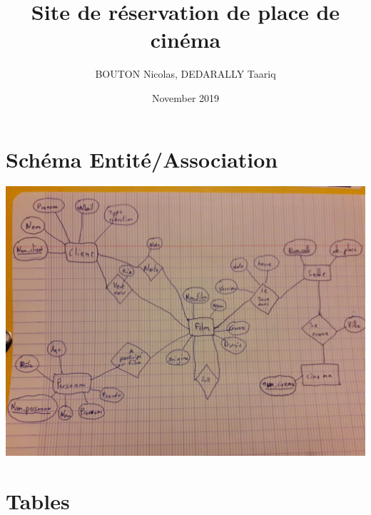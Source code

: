 \documentclass{article}
\title{Site de réservation de place de cinéma}
\author{BOUTON Nicolas, DEDARALLY Taariq}
\date{November 2019}
\begin{document}
\maketitle

\section{Schéma Entité/Association}

\begin{center}
    \includegraphics[scale=0.1]{20191101_213721.jpg}
\end{center}

\newpage

\section{Tables}
\end{document}
